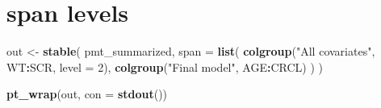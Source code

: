\documentclass[
]{article}
\newenvironment{Shaded}{\begin{snugshade}}{\end{snugshade}}
\newcommand{\DataTypeTok}[1]{\textcolor[rgb]{0.13,0.29,0.53}{#1}}
\newcommand{\DecValTok}[1]{\textcolor[rgb]{0.00,0.00,0.81}{#1}}
\newcommand{\KeywordTok}[1]{\textcolor[rgb]{0.13,0.29,0.53}{\textbf{#1}}}
\newcommand{\NormalTok}[1]{#1}
\newcommand{\OperatorTok}[1]{\textcolor[rgb]{0.81,0.36,0.00}{\textbf{#1}}}
\newcommand{\StringTok}[1]{\textcolor[rgb]{0.31,0.60,0.02}{#1}}
\begin{document}
\clearpage

\hypertarget{span-levels}{%
\section{span levels}\label{span-levels}}

\begin{Shaded}
\begin{Highlighting}[]
\NormalTok{out <-}\StringTok{ }\KeywordTok{stable}\NormalTok{(}
\NormalTok{  pmt_summarized, }
  \DataTypeTok{span =} \KeywordTok{list}\NormalTok{(}
    \KeywordTok{colgroup}\NormalTok{(}\StringTok{"All covariates"}\NormalTok{, WT}\OperatorTok{:}\NormalTok{SCR, }\DataTypeTok{level =} \DecValTok{2}\NormalTok{), }
    \KeywordTok{colgroup}\NormalTok{(}\StringTok{"Final model"}\NormalTok{, AGE}\OperatorTok{:}\NormalTok{CRCL)}
\NormalTok{  )}
\NormalTok{)}

\KeywordTok{pt_wrap}\NormalTok{(out, }\DataTypeTok{con =} \KeywordTok{stdout}\NormalTok{()) }
\end{Highlighting}
\end{Shaded}
\end{document}

